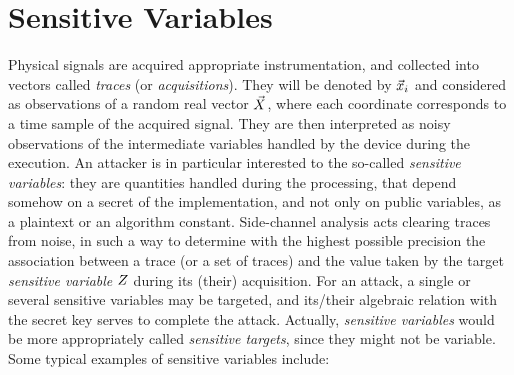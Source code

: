 \section{Sensitive Variables}\label{sec:sensitive_variables}
Physical signals are acquired \via appropriate instrumentation, and collected into vectors called \emph{traces} (or \emph{acquisitions}). They will be denoted by $\vec{x}_i$ and considered as observations of a random real vector $\vec{X}$, where each coordinate corresponds to a time sample of the acquired signal.  They are then interpreted as noisy observations of the intermediate variables handled by the device during the execution. An attacker is in particular interested to the so-called \emph{sensitive variables}:  they are quantities handled during the processing, that depend somehow on a secret of the implementation, and not only on public variables, as a plaintext or an algorithm constant. Side-channel analysis acts clearing traces from noise, in such a way to determine with the highest possible precision the association between a trace (or a set of traces) and the value taken by the target \emph{sensitive variable} $Z$ during its (their) acquisition. For an attack, a single or several sensitive variables may be targeted, and its/their algebraic relation with the secret key serves to complete the attack.  Actually, \emph{sensitive variables} would be more appropriately called \emph{sensitive targets}, since they might not be variable. Some typical examples of sensitive variables include: 


